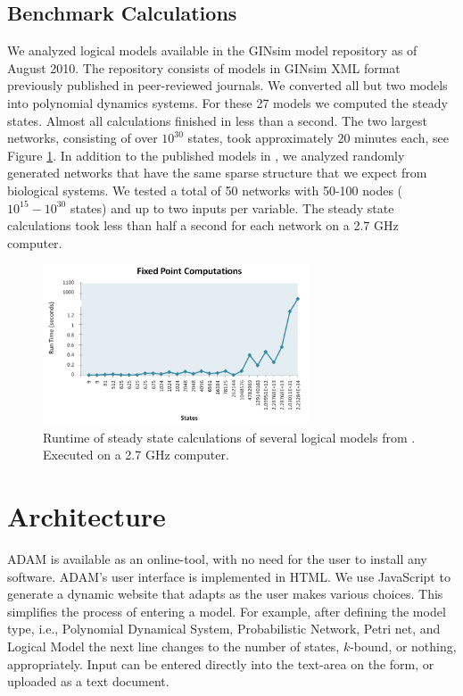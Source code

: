\documentclass[11pt]{amsart}
\begin{document}
\subsection{Benchmark Calculations}
We analyzed logical models
available in the GINsim model repository \cite{GINsimRepo} as of August 2010. The
repository consists of models in GINsim XML format previously published in
peer-reviewed journals. We converted all but two models into polynomial
dynamics systems. For these 27 models we computed the steady states. Almost all
calculations finished in less than a second. The two largest networks,
consisting of over $10^{30}$ states, took approximately 20 minutes each, see
Figure \ref{fig:chart}.
In addition to the published models in \cite{GINsimRepo}, we analyzed
randomly generated networks
that have the same sparse structure that we
expect from biological systems. We tested a total of 50 networks with
50-100 nodes ($10^{15} - 10^{30}$ states) and up to two inputs per variable. The
steady state calculations took less than half a second for each network on
a 2.7 GHz computer.
\begin{figure}[htb]
\centering
\includegraphics[width=0.7\textwidth]{GINSimChart.png}
\caption{Runtime of steady state calculations of several logical models from
\cite{GINsimRepo}. Executed on a 2.7 GHz computer.}
\label{fig:chart}
\end{figure}

\section{Architecture}
ADAM is available as an online-tool, with no need for the user to install any software. ADAM's user interface is implemented in HTML. We use JavaScript to generate a dynamic website that adapts as the user makes various choices. This simplifies the process of entering a model. For example, after defining the model type, i.e., Polynomial Dynamical System, Probabilistic Network, Petri net, and Logical Model the next line changes to the number of states, $k$-bound, or nothing, appropriately. Input can be entered directly into the text-area on the form, or uploaded as a text document.
\end{document}
